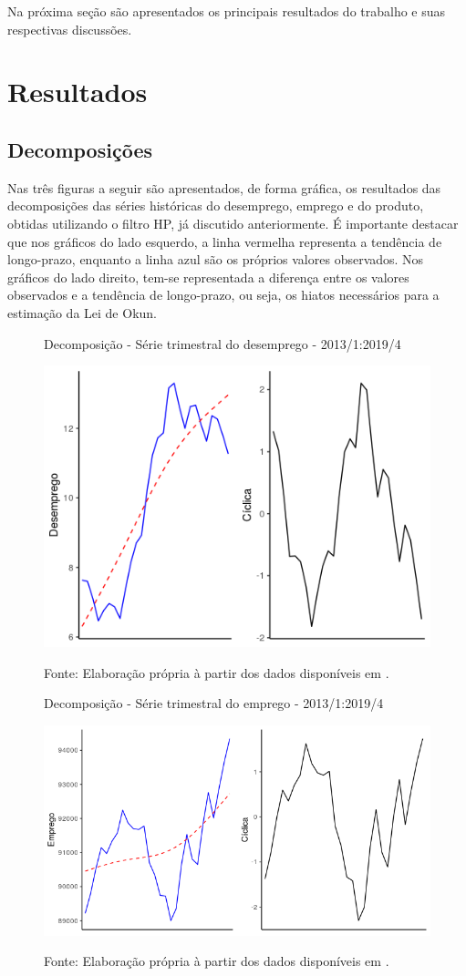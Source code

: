 \documentclass[12pt, openright,oneside, a4paper, english, brazil, section = TITLE, ubsection = Title]{article}
\begin{document}
Na próxima seção são apresentados os principais resultados do trabalho e suas respectivas discussões.

\section{Resultados}

\subsection{Decomposições}

Nas três figuras a seguir são apresentados, de forma gráfica, os resultados das decomposições das séries históricas do desemprego, emprego e do produto, obtidas utilizando o filtro HP, já discutido anteriormente. É importante destacar que nos gráficos do lado esquerdo, a linha vermelha representa a tendência de longo-prazo, enquanto a linha azul são os próprios valores observados. Nos gráficos do lado direito, tem-se representada a diferença entre os valores observados e a tendência de longo-prazo, ou seja, os hiatos necessários para a estimação da Lei de Okun.

\begin{figure}[H]
	\centering
	\caption{Decomposição - Série trimestral do desemprego - 2013/1:2019/4}
	\label{fig:decomposição_desemprego}
	\includegraphics[width=0.45\linewidth]{"Figuras/decomposição_desemprego.png"} \\
\caption*{Fonte: Elaboração própria à partir dos dados disponíveis em \cite{IPEA2020}.}
\end{figure}

\begin{figure}[H]
	\centering
	\caption{Decomposição - Série trimestral do emprego - 2013/1:2019/4}
	\label{fig:decomposição_emprego}
	\includegraphics[width=0.45\linewidth]{"Figuras/decomposição_emprego.png"} \\
\caption*{Fonte: Elaboração própria à partir dos dados disponíveis em \cite{IPEA2020}.}
\end{figure}
\end{document}
